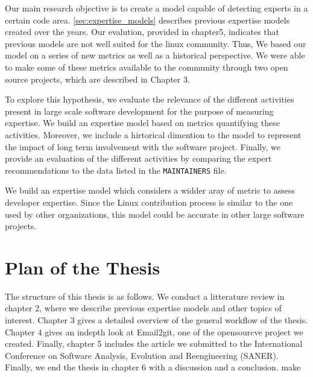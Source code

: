 Our main research objective is to create a model capable of detecting experts in a certain code area. \autoref{sec:expertise_models} describes previous expertise models created over the years. Our evalution, provided in chapter5, indicates that previous models are not well suited for the linux community. Thus, We based our model on a series of new metrics as well as a historical perspective. We were able to make some of these metrics available to the community through two open source projects, which are described in Chapter 3.




To explore this hypothesis, we evaluate the relevance of the different activities present in large scale software development for the purpose of measuring expertise. We build an expertise model based on metrics quantifying these activities. Moreover, we include a hirtorical dimention to the model to represent the impact of long term involvement with the software project. Finally, we provide an evaluation of the different activities by comparing the expert recommendations to the data listed in the \texttt{MAINTAINERS} file.

We build an expertise model which considers a widder aray of metric to assess developer expertise. Since the Linux contribution process is similar to the one used by other organizations, this model could be accurate in other large software projects. 




\section{Plan of the Thesis}


The structure of this thesis is as follows. We conduct a litterature review in chapter 2, where we describe previous expertise models and other topics of interest. Chapter 3 gives a detailed overview of the general workflow of the thesis. Chapter 4 gives an indepth look at Email2git, one of the opensourcve project we created. Finally, chapter 5 includes the article we submitted to the  International Conference on Software Analysis, Evolution and Reengineering (SANER). Finally, we end the thesis in chapter 6 with a discussion and a conclusion. make



